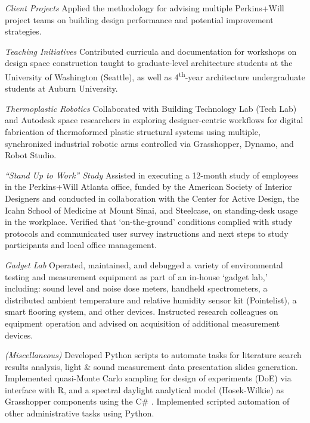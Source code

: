 \documentclass[letterpaper, oneside, 10pt]{article}
\begin{document}
\textit{Client Projects} \DotSep{0.25em}
Applied the  methodology for advising multiple
Perkins+Will project teams on building design performance and
potential improvement strategies.

\textit{Teaching Initiatives} \DotSep{0.25em}
Contributed curricula and documentation for workshops on design space
construction taught to graduate-level architecture students at the
University of Washington (Seattle), as well as 4\textsuperscript{th}-year
architecture undergraduate students at Auburn University.


\hfill
\vspace{-14.5pt}


\textit{Thermoplastic Robotics} \DotSep{0.25em}
Collaborated with Building Technology Lab (Tech Lab) and Autodesk
 space researchers in exploring designer-centric
workflows for digital fabrication of thermoformed plastic structural
systems using multiple, synchronized industrial robotic arms controlled
via Grasshopper, Dynamo, and  Robot Studio.



\textit{``Stand Up to Work'' Study}\DotSep{0.25em}
Assisted in executing a 12-month study of employees in the Perkins+Will
Atlanta office, funded by the American Society of Interior Designers
 and conducted in collaboration with the Center for
Active Design, the Icahn School of Medicine at Mount Sinai, and Steelcase,
on standing-desk usage in the workplace. Verified that `on-the-ground'
conditions complied with study protocols and communicated user survey
instructions and next steps to study participants and local office
management.

\textit{Gadget Lab}\DotSep{0.25em}
Operated, maintained, and debugged a variety of environmental testing and
measurement equipment as part of an in-house ‘gadget lab,’ including:
sound level and noise dose meters, handheld spectrometers, a distributed
ambient temperature and relative humidity sensor kit (Pointelist), a
smart flooring system, and other devices. Instructed research colleagues
on equipment operation and advised on acquisition of additional
measurement devices.

\textit{(Miscellaneous)}\DotSep{0.25em}
Developed Python scripts to automate tasks for literature search results
analysis, light \& sound measurement data presentation slides generation.
Implemented quasi-Monte Carlo sampling for design of experiments (DoE) via
interface with R, and a spectral daylight analytical model (Hosek-Wilkie)
as Grasshopper components using the C\# . Implemented
scripted automation of other administrative tasks using Python.
\end{document}
